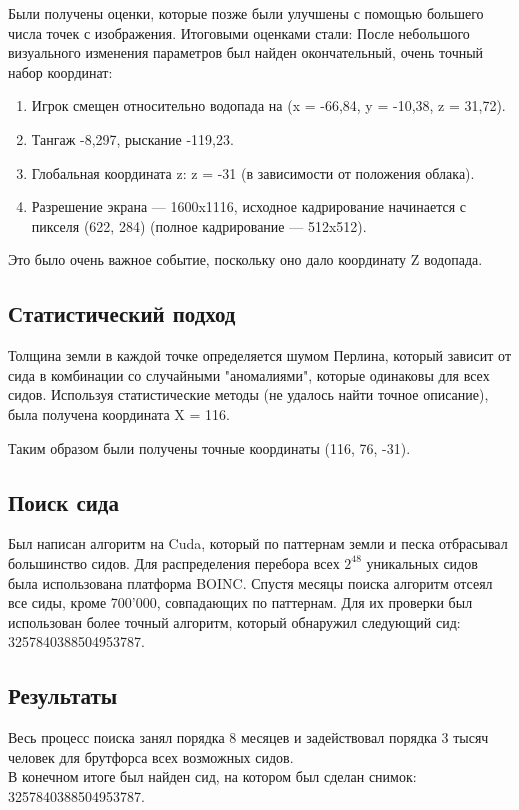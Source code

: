 Были получены оценки, которые позже были улучшены с помощью большего числа точек с изображения.  
Итоговыми оценками стали:
После небольшого визуального изменения параметров был найден окончательный, очень точный набор координат:
\begin{enumerate}
    \item Игрок смещен относительно водопада на (x = -66,84, y = -10,38, z = 31,72).
    \item Тангаж -8,297, рыскание -119,23.
    \item Глобальная координата z: z = -31 (в зависимости от положения облака).
    \item Разрешение экрана — 1600x1116, исходное кадрирование начинается с пикселя (622, 284) (полное кадрирование — 512x512). %
\end{enumerate}

Это было очень важное событие, поскольку оно дало координату Z водопада.

\subsection{Статистический подход}

Толщина земли в каждой точке определяется шумом Перлина, который зависит от сида в комбинации со случайными "аномалиями", которые одинаковы для всех сидов.  
Используя статистические методы (не удалось найти точное описание), была получена координата X = 116.  

Таким образом были получены точные координаты (116, 76, -31).

\subsection{Поиск сида}

Был написан алгоритм на Cuda, который по паттернам земли и песка отбрасывал большинство сидов. Для распределения перебора всех $2^{48}$ уникальных сидов была использована платформа BOINC.  
Спустя месяцы поиска алгоритм отсеял все сиды, кроме 700'000, совпадающих по паттернам. Для их проверки был использован более точный алгоритм, который обнаружил следующий сид: 3257840388504953787.  

\subsection{Результаты}

Весь процесс поиска занял порядка 8 месяцев и задействовал порядка 3 тысяч человек для брутфорса всех возможных сидов.\\ %
В конечном итоге был найден сид, на котором был сделан снимок: 3257840388504953787.

